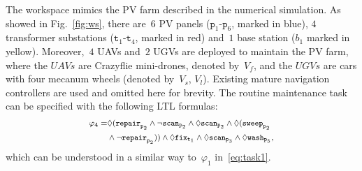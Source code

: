 The workspace mimics the PV farm described in the numerical simulation.
As showed in Fig.~\ref{fig:ws},
there are~$6$ PV panels ($\texttt{p}_1$-$\texttt{p}_6$, marked in blue),
$4$ transformer substations
($\texttt{t}_1$-$\texttt{t}_4$, marked in red)
and~$1$ base station ($b_1$ marked in yellow).
Moreover,~$4$ UAVs and~$2$ UGVs are deployed to maintain the PV farm,
where the $UAVs$ are Crazyflie mini-drones, denoted by~$V_f$, and
the $UGVs$ are cars with four mecanum wheels (denoted by~$V_s$, $V_l$).
Existing mature navigation controllers are used and omitted here for brevity.
The routine maintenance task can be specified with the following LTL formulas:
\begin{equation}\footnotesize
\begin{aligned}
	\varphi_4=& \Diamond(\texttt{repair}_{\texttt{p}_2} \land  \lnot\texttt{scan}_{\texttt{p}_2} \land \Diamond
	\texttt{scan}_{\texttt{p}_2}
	\land \Diamond (\texttt{sweep}_{\texttt{p}_2} \\
	& \land \lnot \texttt{repair}_{\texttt{p}_2}) )\land \Diamond \texttt{fix}_{\texttt{t}_1} \land \Diamond \texttt{scan}_{\texttt{p}_3}
	\land \Diamond \texttt{wash}_{\texttt{p}_5},
\end{aligned}
\end{equation}
which can be understood in a similar way to~$\varphi_1$ in~\eqref{eq:task1}.

